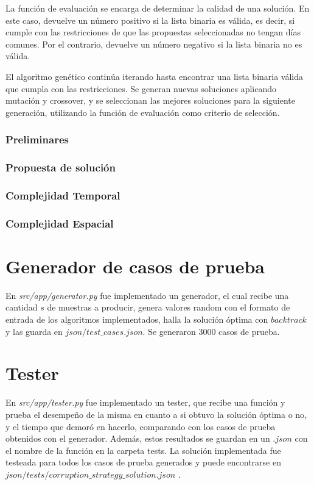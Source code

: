 \documentclass[10pt]{article} %
\begin{document}
	La función de evaluación se encarga de determinar la calidad de una solución. En este caso, devuelve un número positivo si la lista binaria es válida, es decir, si cumple con las restricciones de que las propuestas seleccionadas no tengan días comunes. Por el contrario, devuelve un número negativo si la lista binaria no es válida.
	
	El algoritmo genético continúa iterando hasta encontrar una lista binaria válida que cumpla con las restricciones. Se generan nuevas soluciones aplicando mutación y crossover, y se seleccionan las mejores soluciones para la siguiente generación, utilizando la función de evaluación como criterio de selección.
	
	\subsubsection{Preliminares}
	
	\subsubsection{Propuesta de soluci\'on}
	
	\subsubsection{Complejidad Temporal}

	\subsubsection{Complejidad Espacial}
		
	\section{Generador de casos de prueba}
	
	En \textit{src/app/generator.py} fue implementado un generador, el cual recibe una cantidad $ s $ de muestras a producir, genera valores random con el formato de entrada de los algoritmos implementados, halla la soluci\'on \'optima con $ backtrack $ y las guarda en $ json/test\_cases.json $. Se generaron 3000 casos de prueba.
	
	\section{Tester}
	En \textit{src/app/tester.py} fue implementado un tester, que recibe una funci\'on y prueba el desempe\~no de la misma en cuanto a si obtuvo la soluci\'on \'optima o no, y el tiempo que demor\'o en hacerlo, comparando con los casos de prueba obtenidos con el generador. Adem\'as, estos resultados se guardan en un $ .json $ con el nombre de la funci\'on en la carpeta tests. La soluci\'on implementada fue testeada para todos los casos de prueba generados y puede encontrarse en $ json/tests/corruption\_strategy\_solution.json $ .
	
\end{document}
